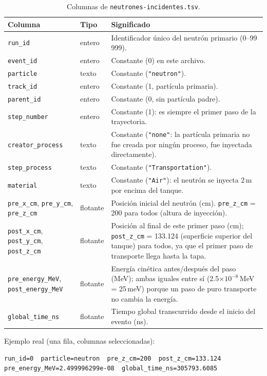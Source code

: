 \documentclass[11pt,a4paper]{article}
\newcommand{\archivo}[1]{\texttt{#1}} %
\newcommand{\var}[1]{\texttt{#1}}
\begin{document}
\begin{table}[H]
\centering
\small
\begin{tabularx}{\linewidth}{l l X}
\toprule
\textbf{Columna} & \textbf{Tipo} & \textbf{Significado} \\
\midrule
\var{run\_id} & entero & Identificador único del neutrón primario (0--99\,999). \\
\var{event\_id} & entero & Constante (0) en este archivo. \\
\var{particle} & texto & Constante (\var{"neutron"}). \\
\var{track\_id} & entero & Constante (1, partícula primaria). \\
\var{parent\_id} & entero & Constante (0, sin partícula padre). \\
\var{step\_number} & entero & Constante (1): es siempre el primer paso de la trayectoria. \\
\var{creator\_process} & texto & Constante (\var{"none"}: la partícula primaria no fue creada por
ningún proceso, fue inyectada directamente). \\
\var{step\_process} & texto & Constante (\var{"Transportation"}). \\
\var{material} & texto & Constante (\var{"Air"}): el neutrón se inyecta 2\,m por encima del tanque. \\
\var{pre\_x\_cm}, \var{pre\_y\_cm}, \var{pre\_z\_cm} & flotante & Posición inicial del neutrón (cm).
\var{pre\_z\_cm} = 200 para todos (altura de inyección). \\
\var{post\_x\_cm}, \var{post\_y\_cm}, \var{post\_z\_cm} & flotante & Posición al final de este
primer paso (cm); \var{post\_z\_cm} = 133.124 (superficie superior del tanque) para todos, ya que
el primer paso de transporte llega hasta la tapa. \\
\var{pre\_energy\_MeV}, \var{post\_energy\_MeV} & flotante & Energía cinética antes/después del
paso (MeV); ambas iguales entre sí (2.5$\times10^{-8}$\,MeV = 25\,meV) porque un paso de puro
transporte no cambia la energía. \\
\var{global\_time\_ns} & flotante & Tiempo global transcurrido desde el inicio del evento (ns). \\
\bottomrule
\end{tabularx}
\caption{Columnas de \archivo{neutrones-incidentes.tsv}.}
\end{table}

\noindent Ejemplo real (una fila, columnas seleccionadas):
\begin{lstlisting}
run_id=0  particle=neutron  pre_z_cm=200  post_z_cm=133.124  pre_energy_MeV=2.499996299e-08  global_time_ns=305793.6085
\end{lstlisting}
\end{document}
